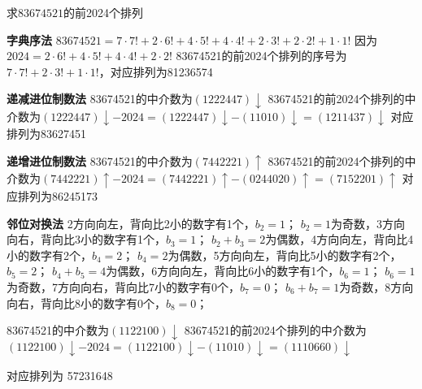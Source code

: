 求$83674521$的前2024个排列

\textbf{字典序法}
$83674521=7\cdot7!+2\cdot6!+4\cdot5!+4\cdot4!+2\cdot3!+2\cdot2!+1\cdot1!$
因为$2024=2\cdot6!+4\cdot5!+4\cdot4!+2\cdot2!$
83674521的前2024个排列的序号为$7\cdot7!+2\cdot3!+1\cdot1!$，对应排列为81236574

\textbf{递减进位制数法}
83674521的中介数为$(1222447)\downarrow$
83674521的前2024个排列的中介数为$(1222447)\downarrow-2024=(1222447)\downarrow-(11010)\downarrow=(1211437)\downarrow$
对应排列为83627451

\textbf{递增进位制数法}
83674521的中介数为$(7442221)\uparrow$
83674521的前2024个排列的中介数为$(7442221)\uparrow-2024=(7442221)\uparrow-(0244020)\uparrow=(7152201)\uparrow$
对应排列为86245173

\textbf{邻位对换法}
2方向向左，背向比2小的数字有1个，$b_2=1$；
$b_2=1$为奇数，3方向向右，背向比3小的数字有1个，$b_3=1$；
$b_2+b_3=2$为偶数，4方向向左，背向比4小的数字有2个，$b_4=2$；
$b_4=2$为偶数，5方向向左，背向比5小的数字有2个，$b_5=2$；
$b_4+b_5=4$为偶数，6方向向左，背向比6小的数字有1个，$b_6=1$；
$b_6=1$为奇数，7方向向右，背向比7小的数字有0个，$b_7=0$；
$b_6+b_7=1$为奇数，8方向向右，背向比8小的数字有0个，$b_8=0$；

83674521的中介数为$(1122100)\downarrow$
83674521的前2024个排列的中介数为$(1122100)\downarrow-2024=(1122100)\downarrow-(11010)\downarrow=(1110660)\downarrow$

对应排列为 57231648